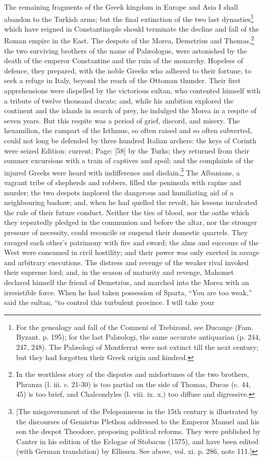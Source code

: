 The remaining fragments of the Greek kingdom in Europe and Asia I shall abandon to the Turkish arms; but the final extinction of the two last dynasties\footnote{For the genealogy and fall of the Comneni of Trebizond, see Ducange (Fam. Byzant. p. 195); for the last Palæologi, the same accurate antiquarian (p. 244, 247, 248). The Palæologi of Montferrat were not extinct till the next century; but they had forgotten their Greek origin and kindred.} which have reigned in Constantinople should terminate the decline and fall of the Roman empire in the East. The despots of the Morea, Demetrius and Thomas,\footnote{In the worthless story of the disputes and misfortunes of the two brothers, Phranza (l. iii. c. 21-30) is too partial on the side of Thomas, Ducas (c. 44, 45) is too brief, and Chalcondyles (l. viii. ix. x.) too diffuse and digressive.} the two surviving brothers of the name of Palæologus, were astonished by the death of the emperor Constantine and the ruin of the monarchy. Hopeless of defence, they prepared, with the noble Greeks who adhered to their fortune, to seek a refuge in Italy, beyond the reach of the Ottoman thunder. Their first apprehensions were dispelled by the victorious sultan, who contented himself with a tribute of twelve thousand ducats; and, while his ambition explored the continent and the islands in search of prey, he indulged the Morea in a respite of seven years. But this respite was a period of grief, discord, and misery. The hexamilion, the rampart of the Isthmus, so often raised and so often subverted, could not long be defended by three hundred Italian archers: the keys of Corinth were seized Edition: current; Page: [58] by the Turks; they returned from their summer excursions with a train of captives and spoil; and the complaints of the injured Greeks were heard with indifference and disdain.\footnote{[The misgovernment of the Peloponnesus in the 15th century is illustrated by the discourses of Gemistus Plethon addressed to the Emperor Manuel and his son the despot Theodore, proposing political reforms. They were published by Canter in his edition of the Eclogae of Stobacus (1575), and have been edited (with German translation) by Ellissen. See above, vol. xi. p. 286, note 111.]} The Albanians, a vagrant tribe of shepherds and robbers, filled the peninsula with rapine and murder; the two despots implored the dangerous and humiliating aid of a neighbouring bashaw; and, when he had quelled the revolt, his lessons inculcated the rule of their future conduct. Neither the ties of blood, nor the oaths which they repeatedly pledged in the communion and before the altar, nor the stronger pressure of necessity, could reconcile or suspend their domestic quarrels. They ravaged each other\texthebrew{}’s patrimony with fire and sword; the alms and succours of the West were consumed in civil hostility; and their power was only exerted in savage and arbitrary executions. The distress and revenge of the weaker rival invoked their supreme lord; and, in the season of maturity and revenge, Mahomet declared himself the friend of Demetrius, and marched into the Morea with an irresistible force. When he had taken possession of Sparta, \texthebrew{“}You are too weak,\texthebrew{}” said the sultan, \texthebrew{“}to control this turbulent province. I will take your 
